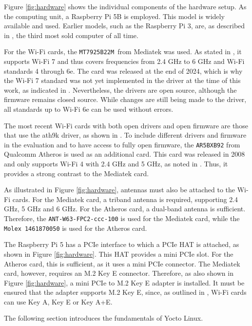 Figure \ref{fig:hardware} shows the individual components of the hardware setup.  
As the computing unit, a Raspberry Pi 5B is employed.  
This model is widely available and used.  
Earlier models, such as the Raspberry Pi 3, are, as described in \cite{raspy}, the third most sold computer of all time.  

For the Wi-Fi cards, the \texttt{MT7925B22M }from Mediatek was used.  
As stated in \cite{mt7925}, it supports Wi-Fi 7 and thus covers frequencies from 2.4 GHz to 6 GHz and Wi-Fi standards 4 through 6e.  
The card was released at the end of 2024, which is why the Wi-Fi 7 standard was not yet implemented in the driver at the time of this work, as indicated in \cite{mt76}.  
Nevertheless, the drivers are open source, although the firmware remains closed source.  
While changes are still being made to the driver, all standards up to Wi-Fi 6e can be used without errors.  

The most recent Wi-Fi cards with both open drivers and open firmware are those that use the ath9k driver, as shown in \cite{ath9k}.  
To include different drivers and firmware in the evaluation and to have access to fully open firmware, the \texttt{AR5BXB92} from Qualcomm Atheros is used as an additional card.  
This card was released in 2008 and only supports Wi-Fi 4 with 2.4 GHz and 5 GHz, as noted in \cite{ar5b}.  
Thus, it provides a strong contrast to the Mediatek card.  

As illustrated in Figure \ref{fig:hardware}, antennas must also be attached to the Wi-Fi cards.  
For the Mediatek card, a triband antenna is required, supporting 2.4 GHz, 5 GHz and 6 GHz.  
For the Atheros card, a dual-band antenna is sufficient.  
Therefore, the \texttt{ANT-W63-FPC2-ccc-100} \cite{te} is used for the Mediatek card, while the \texttt{Molex 1461870050} \cite{molex} is used for the Atheros card.  

The Raspberry Pi 5 has a PCIe interface to which a PCIe HAT is attached, as shown in Figure \ref{fig:hardware}.  
This HAT provides a mini PCIe slot.  
For the Atheros card, this is sufficient, as it uses a mini PCIe connector.  
The Mediatek card, however, requires an M.2 Key E connector.  
Therefore, as also shown in Figure \ref{fig:hardware}, a mini PCIe to M.2 Key E adapter is installed.  
It must be ensured that the adapter supports M.2 Key E, since, as outlined in \cite[p. 24]{pcie}, Wi-Fi cards can use Key A, Key E or Key A+E.  

The following section introduces the fundamentals of Yocto Linux.   

